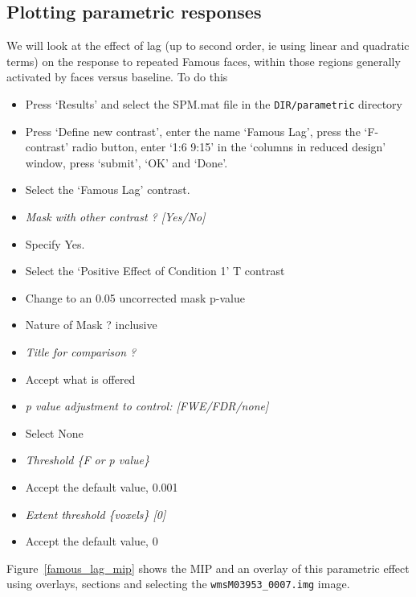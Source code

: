 \documentclass[a4paper,titlepage]{book}
\newcommand{\bi}{\begin{itemize}}
\newcommand{\ei}{\end{itemize}}
\begin{document}
\subsection{Plotting parametric responses}

We will look at the effect of lag (up to second order, ie using linear and quadratic terms) on the response to repeated Famous faces, within those regions generally activated by faces versus baseline. To do this
\bi
\item{Press `Results' and select the SPM.mat file in the 
\verb!DIR/parametric! directory}
\item{Press `Define new contrast', enter the name `Famous Lag', press the `F-contrast' radio button, enter `1:6 9:15' in the `columns in reduced design' window, press `submit', `OK' and `Done'.}
\item{Select the `Famous Lag' contrast.}
\item{\em Mask with other contrast ? [Yes/No]}
\item{Specify Yes.}
\item{Select the `Positive Effect of Condition 1' T contrast}
\item{Change to an 0.05 uncorrected mask p-value}
\item{Nature of Mask ? inclusive}
\item{\em Title for comparison ?}
\item{Accept what is offered}
\item{\em p value adjustment to control: [FWE/FDR/none]}
\item{Select None}
\item{\em Threshold \{F or p value\}}
\item{Accept the default value, 0.001}
\item{\em Extent threshold \{voxels\} [0]}
\item{Accept the default value, 0}
\ei
Figure~\ref{famous_lag_mip} shows the MIP and an
overlay of this parametric effect using overlays, sections and selecting the \verb!wmsM03953_0007.img! image. 
\end{document}
